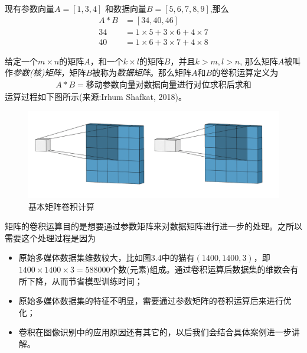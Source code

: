 \documentclass[12pt]{article}
\numberwithin{figure}{section}
\numberwithin{equation}{section}
\begin{document}
\begin{example}
	现有参数向量$A=[1, 3, 4]$ 和数据向量$B = [5, 6, 7 , 8 , 9]$,那么
	\begin{align*}
		A * B & = [34, 40, 46]\\
		34 & = 1\times 5 + 3 \times 6 + 4 \times 7 \\
		40 & = 1 \times 6 + 3 \times 7 + 4 \times 8 
	\end{align*}
\end{example}

\begin{definition}
	给定一个$m \times n$的矩阵$A$，和一个$k \times l$的矩阵$B$，并且$k > m, l > n$, 那么矩阵$A$被叫作\textit{参数(核)矩阵}，矩阵$B$被称为\textit{数据矩阵}。那么矩阵$A$和$B$的卷积运算定义为
	\begin{align*}
		A * B = \text{移动参数向量对数据向量进行对位求积后求和}
	\end{align*}
	运算过程如下图所示(来源:Irhum Shafkat, 2018)。
\end{definition}

\begin{figure}[H]
	\centering
	\includegraphics[width=\textwidth]{fig/mtconvo}
	\caption{基本矩阵卷积计算}
\end{figure}

\begin{remark}
	矩阵的卷积运算目的是想要通过参数矩阵来对数据矩阵进行进一步的处理。之所以需要这个处理过程是因为
	\begin{itemize}
		\item 原始多媒体数据集维数较大，比如图3.4中的猫有$(1400, 1400, 3)$，即$1400 \times 1400 \times 3 = 588000$个数(元素)组成。通过卷积运算后数据集的维数会有所下降，从而节省模型训练时间；
		\item 原始多媒体数据集的特征不明显，需要通过参数矩阵的卷积运算后来进行优化；
		\item 卷积在图像识别中的应用原因还有其它的，以后我们会结合具体案例进一步讲解。
	\end{itemize}
\end{remark}
\end{document}
